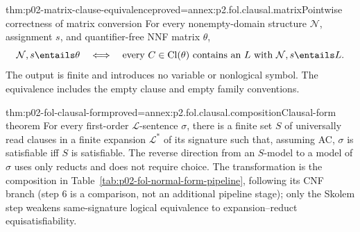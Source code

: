 \begin{hblemma}{thm:p02-matrix-clause-equivalence}{proved=annex:p2.fol.clausal.matrix}{Pointwise correctness of matrix conversion}
For every nonempty-domain structure \(\mathcal N\), assignment \(s\),
and quantifier-free NNF matrix \(\theta\),
\[
 \mathcal N,s\entails\theta
 \quad\Longleftrightarrow\quad
 \text{every }C\in\operatorname{Cl}(\theta)
       \text{ contains an }L\text{ with }\mathcal N,s\entails L.
\]
The output is finite and introduces no variable or nonlogical symbol.
The equivalence includes the empty clause and empty family conventions.
\end{hblemma}

\begin{hbtheorem}{thm:p02-fol-clausal-form}{proved=annex:p2.fol.clausal.composition}{Clausal-form theorem}
For every first-order \(\mathcal L\)-sentence \(\sigma\), there is a finite set \(S\) of
universally read clauses in a finite expansion \(\mathcal L^*\) of its signature such that,
assuming AC, \(\sigma\) is satisfiable iff \(S\) is satisfiable.  The reverse
direction from an \(S\)-model to a model of \(\sigma\) uses only reducts and
does not require choice.  The transformation is the composition in
Table~\ref{tab:p02-fol-normal-form-pipeline}, following its CNF branch
(step 6 is a comparison, not an additional pipeline stage); only the Skolem step weakens
same-signature logical equivalence to expansion--reduct equisatisfiability.
\end{hbtheorem}

